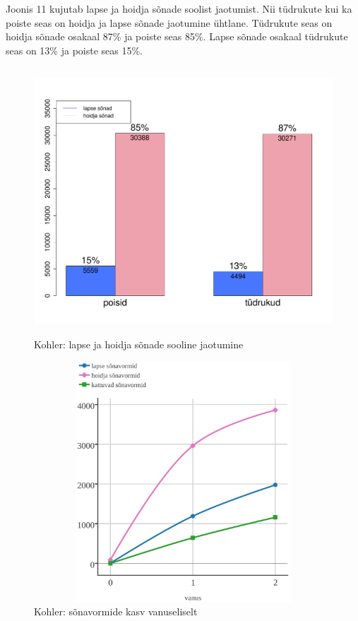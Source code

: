 \documentclass[12pt]{article}
\begin{document}
Joonis 11 kujutab lapse ja hoidja sõnade soolist jaotumist. Nii tüdrukute kui ka poiste seas on hoidja ja lapse sõnade jaotumine ühtlane. Tüdrukute seas on hoidja sõnade osakaal 87\% ja poiste seas 85\%. Lapse sõnade osakaal tüdrukute seas on 13\% ja poiste seas 15\%.

\begin{figure}[H]
    \centering
    \includegraphics[width=12cm, height=10cm]{kohler_sugu_sonad}
    \caption{Kohler: lapse ja hoidja sõnade sooline jaotumine}
\end{figure}

\begin{figure}[H]
    \centering
    \includegraphics[width=12cm, height=9cm]{kohler_kum_crop}
    \caption{Kohler: sõnavormide kasv vanuseliselt}
\end{figure}
\end{document}
